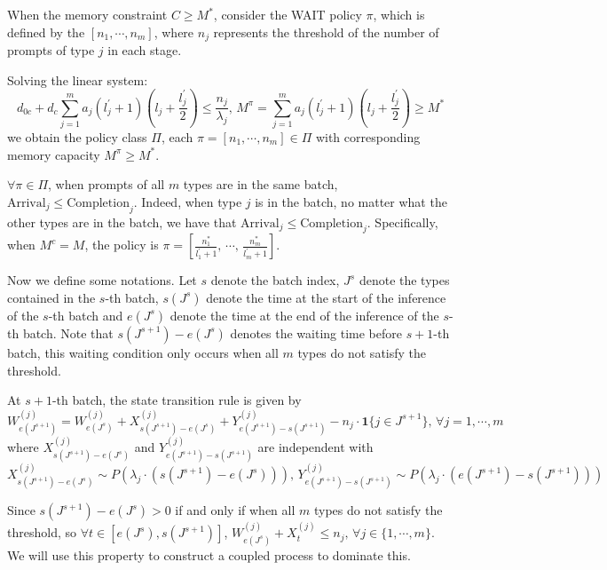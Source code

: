 When the memory constraint $C\geq M^*$, consider the WAIT policy $\pi$, which is defined by the $[n_1,\cdots,n_m]$, where $n_j$ represents the threshold of the number of prompts of type $j$ in each stage.

Solving the linear system:
$$d_{0c}+d_c\sum_{j=1}^ma_j(l_j^\prime+1)\left(l_j+\frac{l_j^\prime}{2}\right)\leq \frac{n_j}{\lambda_j},\,M^{\pi} = \sum_{j=1}^ma_j(l_j^\prime+1)\left(l_j+\frac{l_j^\prime}{2}\right)\geq  M^*$$
we obtain the policy class $\Pi$, each $\pi = [n_1,\cdots,n_m]\in \Pi$ with corresponding memory capacity $M^{\pi} \geq  M^*$.

$\forall \pi \in \Pi$, when prompts of all $m$ types are in the same batch, $\text{Arrival}_j\leq \text{Completion}_j$. Indeed, when type $j$ is in the batch, no matter what the other types are in the batch, we have that $\text{Arrival}_j\leq \text{Completion}_j$. Specifically, when $M^c = M$, the policy is $\pi = [ \frac{n_1^*}{l_1^\prime+1},\,\cdots,\,\frac{n_m^*}{l_m^\prime+1} ]$. 

Now we define some notations. Let $s$ denote the batch index, $J^s$ denote the types contained in the $s$-th batch, $s(J^s)$ denote the time at the start of the inference of the $s$-th batch and $e(J^s)$ denote the time at the end of the inference of the $s$-th batch. Note that $s(J^{s+1})-e(J^s)$ denotes the waiting time before $s+1$-th batch, this waiting condition only occurs when all $m$ types do not satisfy the threshold.

At $s+1$-th batch, the state transition rule is given by
$$W^{(j)}_{e(J^{s+1})}=W^{(j)}_{e(J^s)}+X^{(j)}_{s(J^{s+1})-e(J^{s})}+Y^{(j)}_{e(J^{s+1})-s(J^{s+1})}- n_j\cdot \mathbf{1}\{j\in J^{s+1}\} ,\,\forall j  = 1,\cdots,m$$
where $X^{(j)}_{s(J^{s+1})-e(J^{s})}$ and $Y^{(j)}_{e(J^{s+1})-s(J^{s+1})}$ are independent with
$$X^{(j)}_{s(J^{s+1})-e(J^{s})} \sim P(\lambda_j \cdot (s(J^{s+1})-e(J^{s}))),\,Y^{(j)}_{e(J^{s+1})-s(J^{s+1})} \sim P(\lambda_j \cdot (e(J^{s+1})-s(J^{s+1})))$$

Since $s(J^{s+1})-e(J^{s})>0$ if and only if  when all $m$ types do not satisfy the threshold, so $\forall t \in [e(J^s), s(J^{s+1})]$, $W^{(j)}_{e(J^s)}+X_t^{(j)}\leq n_j,\, \forall j \in \{1,\cdots,m\}$. We will use this property to construct a coupled process to dominate this. 

